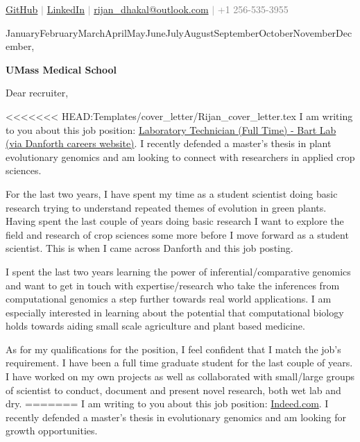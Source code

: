 \documentclass[a4paper, 12pt]{article}
\makeatletter
\def\phonenum{+1 256-535-3955}
\def\email{mailto:rijan\_dhakal@outlook.com}
\def\github{https://github.com/RijanDhakal1010}
\def\linkedin{https://www.linkedin.com/in/rijan-dhakal-488853224/}
\def\companyname{Bart Lab}
\def\positionurl{https://www.paycomonline.net/v4/ats/web.php/jobs/ViewJobDetails?job=83495&clientkey=0386834D209CD1EA462A147F53A126FF}
\def\companyname{UMass Medical School}
\def\positionurl{https://www.indeed.com/viewjob?from=app-tracker-post_apply-appcard&hl=en&jk=fcefed8958a60ff8&tk=1gr74ujbik1r7800}
\def\today{\number\day\space\ifcase\month\or January\or February\or March\or April\or May\or June\or July\or August\or September\or October\or November\or December\fi, \number\year}
\makeatother
\begin{document}
\center \small\textcolor{grey}{{\href{\github}{GitHub} $|$ \href{\linkedin}{LinkedIn} $|$ \href{\email}{rijan\_dhakal@outlook.com} $|$ \phonenum}\\[10pt]}


\raggedleft

\begin{minipage}[t]{0.2\textwidth}
    \today
\end{minipage}

\raggedright

\begin{minipage}[t]{0.5\textwidth}
    \textbf{\companyname}

    \vspace{\baselineskip}

    Dear recruiter,
\end{minipage}

\vspace{\baselineskip}

<<<<<<< HEAD:Templates/cover_letter/Rijan_cover_letter.tex
I am writing to you about this job position: \href{\positionurl}{Laboratory Technician (Full Time) - Bart Lab (via Danforth careers website)}. I recently defended a master’s thesis in plant evolutionary genomics and am looking to connect with researchers in applied crop sciences.

For the last two years, I have spent my time as a student scientist doing basic research trying to understand repeated themes of evolution in green plants. Having spent the last couple of years doing basic research I want to explore the field and research of crop sciences some more before I move forward as a student scientist. This is when I came across Danforth and this job posting.

I spent the last two years learning the power of inferential/comparative genomics and want to get in touch with expertise/research who take the inferences from computational genomics a step further towards real world applications. I am especially interested in learning about the potential that computational biology holds towards aiding small scale agriculture and plant based medicine.

As for my qualifications for the position, I feel confident that I match the job’s requirement. I have been a full time graduate student for the last couple of years. I have worked on my own projects as well as collaborated with small/large groups of scientist to conduct, document and present novel research, both wet lab and dry.
=======
I am writing to you about this job position: \href{\positionurl}{Indeed.com}. I recently defended a master’s thesis in evolutionary genomics and am looking for growth opportunities.
\end{document}
